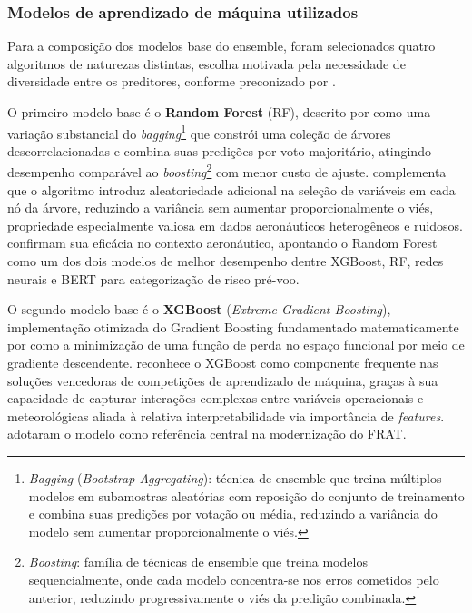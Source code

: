 \documentclass[english,brazilian]{UNISINOSartigo}
\begin{document}
\subsubsection{Modelos de aprendizado de máquina utilizados}

Para a composição dos modelos base do ensemble, foram selecionados quatro
algoritmos de naturezas distintas, escolha motivada pela necessidade de diversidade
entre os preditores, conforme preconizado por .

O primeiro modelo base é o \textbf{Random Forest} (RF), descrito por
 como uma variação substancial do
\textit{bagging}\footnote{\textit{Bagging} (\textit{Bootstrap Aggregating}):
técnica de ensemble que treina múltiplos modelos em subamostras aleatórias com
reposição do conjunto de treinamento e combina suas predições por votação ou
média, reduzindo a variância do modelo sem aumentar proporcionalmente o viés.}
que constrói uma coleção de árvores descorrelacionadas e combina suas predições
por voto majoritário, atingindo desempenho comparável ao
\textit{boosting}\footnote{\textit{Boosting}: família de técnicas de ensemble
que treina modelos sequencialmente, onde cada modelo concentra-se nos erros
cometidos pelo anterior, reduzindo progressivamente o viés da predição
combinada.} com menor
custo de ajuste.  complementa que o algoritmo introduz
aleatoriedade adicional na seleção de variáveis em cada nó da árvore, reduzindo a
variância sem aumentar proporcionalmente o viés, propriedade especialmente
valiosa em dados aeronáuticos heterogêneos e ruidosos. 
confirmam sua eficácia no contexto aeronáutico, apontando o Random Forest como
um dos dois modelos de melhor desempenho dentre XGBoost, RF, redes neurais e
BERT para categorização de risco pré-voo.

O segundo modelo base é o \textbf{XGBoost} (\textit{Extreme Gradient Boosting}),
implementação otimizada do Gradient Boosting fundamentado matematicamente por
 como a minimização de uma função de perda no espaço
funcional por meio de gradiente descendente.  reconhece o
XGBoost como componente frequente nas soluções vencedoras de competições de
aprendizado de máquina, graças à sua capacidade de capturar interações complexas
entre variáveis operacionais e meteorológicas aliada à relativa interpretabilidade via
importância de \textit{features}.  adotaram o modelo como
referência central na modernização do FRAT.
\end{document}
